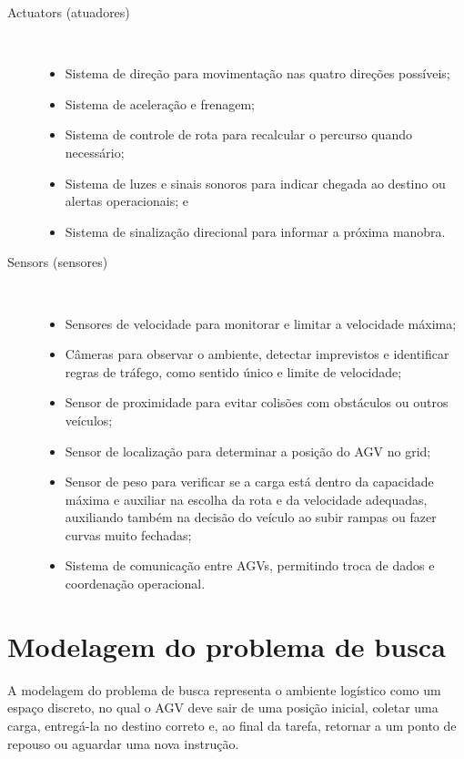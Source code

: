 \documentclass[12pt,a4paper]{article}
\begin{document}
\begin{description}
    \item[Actuators (atuadores)] ~\\
    \begin{itemize}
        \item Sistema de direção para movimentação nas quatro direções possíveis;
        \item Sistema de aceleração e frenagem;
        \item Sistema de controle de rota para recalcular o percurso quando necessário;
        \item Sistema de luzes e sinais sonoros para indicar chegada ao destino ou alertas operacionais; e
        \item Sistema de sinalização direcional para informar a próxima manobra.
    \end{itemize}

    \item[Sensors (sensores)] ~\\
\begin{itemize}
        \item Sensores de velocidade para monitorar e limitar a velocidade máxima;
        \item Câmeras para observar o ambiente, detectar imprevistos e identificar regras de tráfego, como sentido único e limite de velocidade;
        \item Sensor de proximidade para evitar colisões com obstáculos ou outros veículos;
        \item Sensor de localização para determinar a posição do \ac{AGV} no grid;
        \item Sensor de peso para verificar se a carga está dentro da capacidade máxima e auxiliar na escolha da rota e da velocidade adequadas, auxiliando também na decisão do veículo ao subir rampas ou fazer curvas muito fechadas;
        \item Sistema de comunicação entre \ac{AGV}s, permitindo troca de dados e coordenação operacional.
    \end{itemize}
\end{description}


\section{Modelagem do problema de busca}

A modelagem do problema de busca representa o ambiente logístico como um espaço discreto, no qual o \ac{AGV} deve sair de uma posição inicial, coletar uma carga, entregá-la no destino correto e, ao final da tarefa, retornar a um ponto de repouso ou aguardar uma nova instrução.
\end{document}
